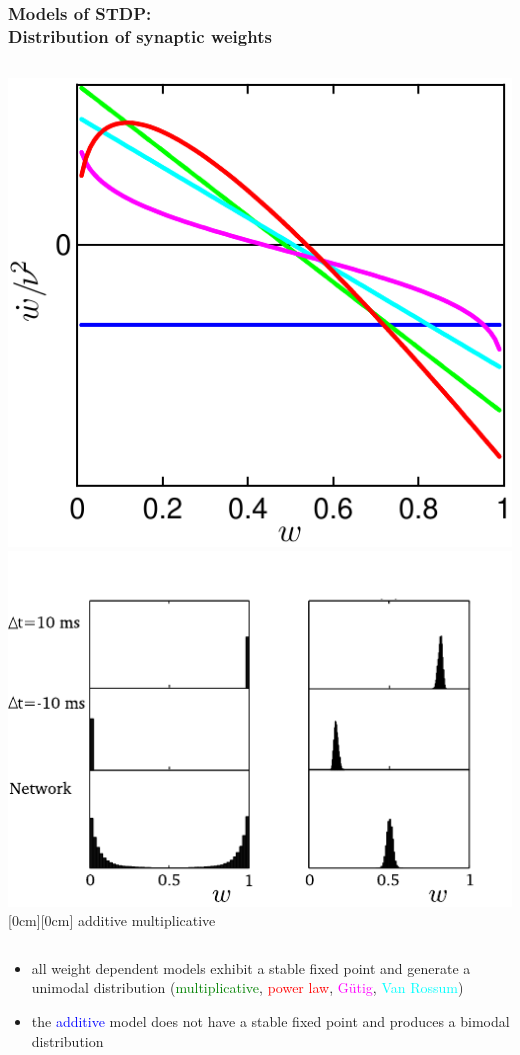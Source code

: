 \documentclass{beamer}
\begin{document}
\begin{frame}
  \frametitle{Models of STDP:\\Distribution of synaptic weights}
  \begin{columns}

    \vspace*{5mm}
    \includegraphics[width=\textwidth]{./figures/fix_point}
    \includegraphics[width=\textwidth]{./figures/add_mul_dists}
    \hspace*{-5cm}
    \raisebox{4.3cm}[0cm][0cm]{%
        \scriptsize{additive \hspace*{13mm} multiplicative}
    }
  \end{columns}
\begin{itemize}
  \item all weight dependent models exhibit a stable fixed point and generate a unimodal distribution (\textcolor{green}{multiplicative}, \textcolor{red}{power law}, \textcolor{magenta}{G{\"u}tig}, \textcolor{cyan}{Van Rossum})
  \item the \textcolor{blue}{additive} model does not have a stable fixed point and produces a bimodal distribution
\end{itemize}
\end{frame}
\end{document}
